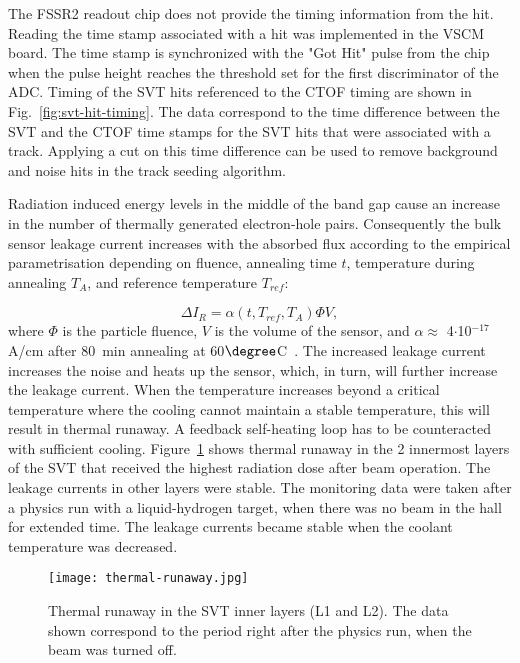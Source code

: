 The FSSR2 readout chip does not provide the timing information from the hit. Reading the time stamp associated with a hit was implemented in the VSCM board. The time stamp is synchronized with the "Got Hit" pulse from the chip when the pulse height reaches the threshold set for the first discriminator of the ADC. Timing of the SVT hits referenced to the CTOF timing are shown in Fig.~\ref{fig:svt-hit-timing}. The data correspond to the time difference between the SVT and the CTOF time stamps for the SVT hits that were associated with a track. Applying a cut on this time difference can be  used to remove background and noise hits in the track seeding algorithm.

Radiation induced energy levels in the middle of the band gap cause an increase in the number of thermally generated electron-hole pairs. Consequently the bulk sensor leakage current increases with the absorbed flux according to the empirical parametrisation depending on fluence, annealing time $t$, temperature during annealing $T_A$, and reference temperature $T_{ref}$:

\begin{equation} \Delta I_R = \alpha(t, T_{ref}, T_A)\Phi{V} \label{eq:leakage-fluence},
\end{equation}
where $\Phi$ is the particle fluence, $V$ is the volume of the sensor, and $\alpha \approx$ 4$\cdot$10$^{-17}$ A/cm after 80~min annealing at 60$\degree$C~\cite{DIERLAMMTHESIS}. The increased leakage current increases the noise and heats up the sensor, which, in turn, will further increase the leakage current. When the temperature increases beyond a critical temperature where the cooling cannot maintain a stable temperature, this will result in thermal runaway. A feedback self-heating loop has to be counteracted with sufficient cooling. Figure~\ref{fig:thermal-runaway} shows thermal runaway in the 2 innermost layers of the SVT that received the highest radiation dose after beam operation. The leakage currents in other layers were stable. The monitoring data were taken after a physics run with a liquid-hydrogen target, when there was no beam in the hall for extended time. The leakage currents became stable when the coolant temperature was decreased.

\begin{figure}[hbt] 
\centering 
\texttt{[image: thermal-runaway.jpg]}
\caption{Thermal runaway in the SVT inner layers (L1 and L2). The data shown correspond to the period right after the physics run, when the beam was turned off.}
\label{fig:thermal-runaway}
\end{figure}

